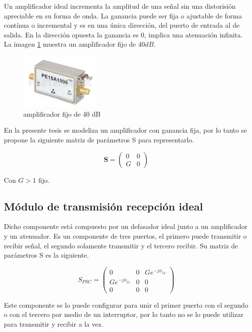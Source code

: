 Un amplificador ideal incrementa la amplitud de una señal sin una distorisión apreciable en su forma de onda. La ganancia puede
ser fija o ajustable de forma contínua o incremental \cite{Standard1996} y es en una única dirección, del puerto de entrada al
de salida. En la dirección opuesta la ganancia es 0, implica una atenuación infinita. La imagen \ref{fig:amplifier} muestra un
amplificador fijo de $40 dB$.

\begin{figure}[H]
 \centering
 \includegraphics[width=4cm]{gfx/amplifier.png}
 \caption{amplificador fijo de 40 dB \cite{Pasternack2014}}
 \label{fig:amplifier}
\end{figure}

En la presente tesis se modeliza un amplificador con ganancia fija, por lo tanto se propone la siguiente matriz de parámetros S
para representarlo.

$$
\mathbf{S} = \begin{pmatrix} 0 & 0\\G & 0\end{pmatrix}
$$

Con $G > 1$ fijo.


\subsection{Módulo de transmisión recepción ideal}

Dicho componente está compuesto por un defasador ideal junto a un amplificador y un atenuador. Es un componente de tres puertos,
el primero puede transmitir o recibir señal, el segundo solamente transmitir y el tercero recibir. Su matriz de parámetros S es
la siguiente.

$$
	S_{PSC} = \begin{pmatrix} 0&0&Ge^{-j\phi_{13}} \\ Ge^{-j\phi_{21}}&0&0 \\ 0&0&0\end{pmatrix} 
$$

Este componente se lo puede configurar para unir el primer puerto con el segundo o con el tercero por medio de un interruptor, 
por lo tanto no se lo puede utilizar para transmitir y recibir a la vez. 

